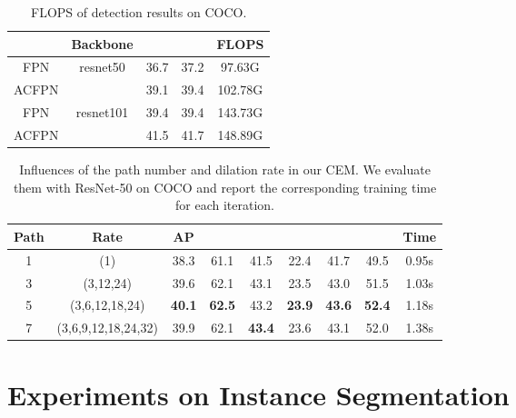 \documentclass[journal]{IEEEtran}
\def\qcr{\fontfamily{qcr}\selectfont}
\begin{document}
	\begin{table}[t]
		\centering
\caption{FLOPS of detection results on COCO.}
{
			\begin{tabular}{c|c|ccc}
				\toprule
				& Backbone & {\qcr{minival}} & {\qcr{test-dev}} & FLOPS \\
				\hline
				FPN   & \multirow{2}{*}{resnet50} & 36.7  & 37.2  & 97.63G \\
				ACFPN &       & 39.1  & 39.4  & 102.78G \\
				\hline
				FPN   & \multirow{2}{*}{resnet101} & 39.4  & 39.4  & 143.73G \\
				ACFPN &       & 41.5  & 41.7  & 148.89G \\
				\bottomrule
			\end{tabular}}
		\label{tab:flops}\end{table}



	\begin{table}[t]
		\centering
\caption{Influences of the path number and dilation rate in our CEM. We evaluate them with ResNet-50 on COCO {\qcr{minival}} and report the corresponding training time for each iteration.}
		\resizebox{1.0\linewidth}{!}
		{
			\begin{tabular}{c|c|cccccc|c}
				\toprule
				Path &  Rate & AP  &  &  &  &  &  & Time \\
				\hline
1 & (1) & 38.3 & 61.1 & 41.5 & 22.4 & 41.7 & 49.5 & 0.95s\\
				3 & (3,12,24) & 39.6  & 62.1  & 43.1  & 23.5  & 43.0  & 51.5 & 1.03s\\
				5 & (3,6,12,18,24) & \textbf{40.1}  & \textbf{62.5}  & 43.2  & \textbf{23.9}  & \textbf{43.6}  & \textbf{52.4} & 1.18s\\
				7 & (3,6,9,12,18,24,32) & 39.9  & 62.1  & \textbf{43.4}  & 23.6  & 43.1  & 52.0 & 1.38s\\
				\bottomrule
			\end{tabular}\label{tab:dilation_rate}}
	\end{table}

	
	\section{Experiments on Instance Segmentation}
	
\end{document}
